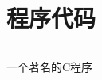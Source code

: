 \chapter{程序代码}

\begin{listing}[H]
  \inputminted[fontsize=\footnotesize,frame=single]{c}{hello.c}
  \caption{一个著名的C程序}
  \label{lst:hello}
\end{listing}

